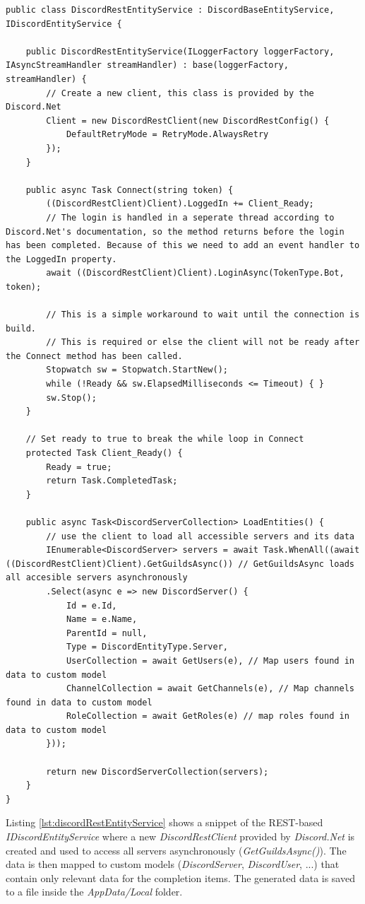 \begin{lstlisting}[style=CSharp, caption={Implementation of the DiscordRestEntityService}, label={lst:discordRestEntityService}]
public class DiscordRestEntityService : DiscordBaseEntityService, IDiscordEntityService {
	
	public DiscordRestEntityService(ILoggerFactory loggerFactory, IAsyncStreamHandler streamHandler) : base(loggerFactory, streamHandler) {
		// Create a new client, this class is provided by the Discord.Net
		Client = new DiscordRestClient(new DiscordRestConfig() {
			DefaultRetryMode = RetryMode.AlwaysRetry
		});
	}

	public async Task Connect(string token) {		
		((DiscordRestClient)Client).LoggedIn += Client_Ready;
		// The login is handled in a seperate thread according to Discord.Net's documentation, so the method returns before the login has been completed. Because of this we need to add an event handler to the LoggedIn property.
		await ((DiscordRestClient)Client).LoginAsync(TokenType.Bot, token); 
		
		// This is a simple workaround to wait until the connection is build.
		// This is required or else the client will not be ready after the Connect method has been called.
		Stopwatch sw = Stopwatch.StartNew();
		while (!Ready && sw.ElapsedMilliseconds <= Timeout) { } 
		sw.Stop();
	}

	// Set ready to true to break the while loop in Connect
	protected Task Client_Ready() {
		Ready = true;
		return Task.CompletedTask;
	}
	
	public async Task<DiscordServerCollection> LoadEntities() {	
		// use the client to load all accessible servers and its data
		IEnumerable<DiscordServer> servers = await Task.WhenAll((await ((DiscordRestClient)Client).GetGuildsAsync()) // GetGuildsAsync loads all accesible servers asynchronously
		.Select(async e => new DiscordServer() {
			Id = e.Id,
			Name = e.Name,
			ParentId = null,
			Type = DiscordEntityType.Server,
			UserCollection = await GetUsers(e), // Map users found in data to custom model
			ChannelCollection = await GetChannels(e), // Map channels found in data to custom model
			RoleCollection = await GetRoles(e) // map roles found in data to custom model
		}));
		
		return new DiscordServerCollection(servers);
	}
}
\end{lstlisting}
Listing \ref{lst:discordRestEntityService} shows a snippet of the REST-based \textit{IDiscordEntityService} where a new \textit{DiscordRestClient} provided by \textit{Discord.Net} is created and used to access all servers asynchronously (\textit{GetGuildsAsync()}). The data is then mapped to custom models (\textit{DiscordServer}, \textit{DiscordUser}, ...) that contain only relevant data for the completion items. The generated data is saved to a file inside the \textit{AppData/Local} folder.
